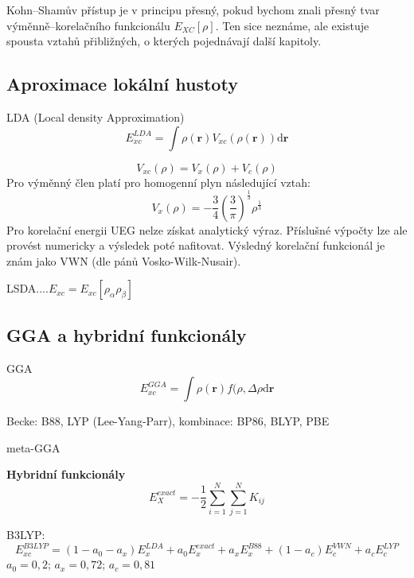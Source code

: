 Kohn--Shamův přístup je v principu přesný, pokud bychom znali přesný tvar výměnně--korelačního funkcionálu $E_{XC}[\rho]$.
Ten sice neznáme, ale existuje spousta vztahů přibližných, o kterých pojednávají další kapitoly.


\subsection{Aproximace lokální hustoty}

LDA (Local density Approximation)
\begin{equation}
E_{xc}^{LDA}=\int \rho(\textbf{r})V_{xc}(\rho(\textbf{r}))\mathrm{d}\textbf{r} 
\end{equation}


\begin{equation}
V_{xc}(\rho)=V_x(\rho)+V_c(\rho)
\end{equation}
Pro výměnný člen platí pro homogenní plyn následující vztah:
\begin{equation}
V_x(\rho)=-\frac{3}{4}\left(\frac{3}{\pi}\right)^{\frac{1}{3}}\rho^{\frac{1}{3}}
\end{equation}
Pro korelační energii UEG nelze získat analytický výraz. Příslušné výpočty lze ale provést numericky a výsledek poté nafitovat. Výsledný korelační funkcionál je znám jako VWN (dle pánů Vosko-Wilk-Nusair).

LSDA....$E_{xc}=E_{xc}[\rho_\alpha\rho_\beta]$ 


\subsection{GGA a hybridní funkcionály}
GGA 
\begin{equation}
E_{xc}^{GGA}=\int \rho(\textbf{r})f(\rho,\Delta\rho\mathrm{d}\textbf{r} 
\end{equation}

Becke: B88, LYP (Lee-Yang-Parr),
kombinace: BP86, BLYP, PBE

meta-GGA

\textbf{Hybridní funkcionály}
\begin{equation}
E_X^{exact}=-\frac{1}{2}\sum_{i=1}^N\sum_{j=1}^N K_{ij}
\end{equation}

B3LYP:
\begin{equation}
E_{xc}^{B3LYP}=(1-a_0-a_x)E_x^{LDA}+a_0E_x^{exact}+a_xE_x^{B88}+(1-a_c)E_c^{VWN}+a_c E_c^{LYP}
\end{equation}
$a_0=0,2$; $a_x=0,72$; $a_c=0,81$

